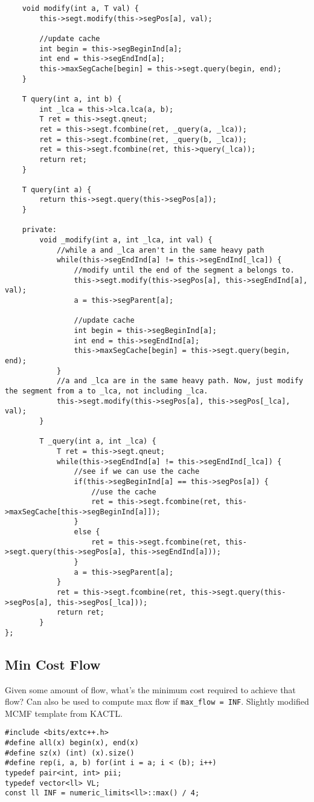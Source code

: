 \documentclass[8pt, headheight=10pt, a4paper]{article}
\begin{document}
\begin{multicols*}{3}
\begin{lstlisting}
    void modify(int a, T val) {
        this->segt.modify(this->segPos[a], val);

        //update cache
        int begin = this->segBeginInd[a];
        int end = this->segEndInd[a];
        this->maxSegCache[begin] = this->segt.query(begin, end);
    }

    T query(int a, int b) {
        int _lca = this->lca.lca(a, b);
        T ret = this->segt.qneut;
        ret = this->segt.fcombine(ret, _query(a, _lca));
        ret = this->segt.fcombine(ret, _query(b, _lca));
        ret = this->segt.fcombine(ret, this->query(_lca));
        return ret;
    }

    T query(int a) {
        return this->segt.query(this->segPos[a]);
    }

    private:
        void _modify(int a, int _lca, int val) {
            //while a and _lca aren't in the same heavy path
            while(this->segEndInd[a] != this->segEndInd[_lca]) {
                //modify until the end of the segment a belongs to. 
                this->segt.modify(this->segPos[a], this->segEndInd[a], val);
                a = this->segParent[a];

                //update cache
                int begin = this->segBeginInd[a];
                int end = this->segEndInd[a];
                this->maxSegCache[begin] = this->segt.query(begin, end);
            }
            //a and _lca are in the same heavy path. Now, just modify the segment from a to _lca, not including _lca. 
            this->segt.modify(this->segPos[a], this->segPos[_lca], val);
        }

        T _query(int a, int _lca) {
            T ret = this->segt.qneut;
            while(this->segEndInd[a] != this->segEndInd[_lca]) {
                //see if we can use the cache
                if(this->segBeginInd[a] == this->segPos[a]) {
                    //use the cache
                    ret = this->segt.fcombine(ret, this->maxSegCache[this->segBeginInd[a]]);
                }
                else {
                    ret = this->segt.fcombine(ret, this->segt.query(this->segPos[a], this->segEndInd[a]));
                }
                a = this->segParent[a];
            }
            ret = this->segt.fcombine(ret, this->segt.query(this->segPos[a], this->segPos[_lca]));
            return ret;
        }
};
\end{lstlisting}

\subsection{Min Cost Flow}
Given some amount of flow, what's the minimum cost required to achieve that flow? Can also be used to compute max flow if \lstinline{max_flow = INF}. 
Slightly modified MCMF template from KACTL.
\begin{lstlisting}
#include <bits/extc++.h>
#define all(x) begin(x), end(x)
#define sz(x) (int) (x).size()
#define rep(i, a, b) for(int i = a; i < (b); i++)
typedef pair<int, int> pii;
typedef vector<ll> VL;
const ll INF = numeric_limits<ll>::max() / 4;


\end{lstlisting}
\end{multicols*}
\end{document}
